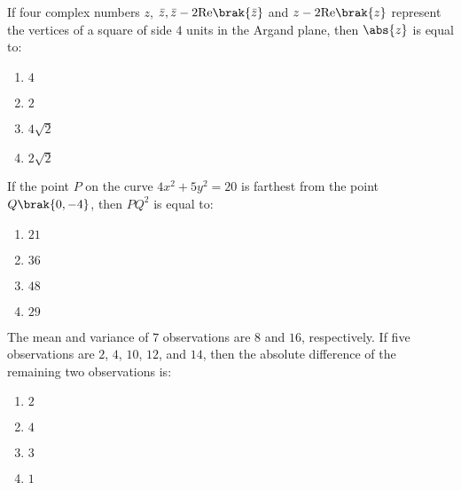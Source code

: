     \item If four complex numbers $z$, $\bar{z},\bar{z} - 2 \text{Re}\brak{\bar{z}}$ and $z - 2 \text{Re}\brak{z}$ represent the vertices of a square of side $4$ units in the Argand plane, then $\abs{z}$ is equal to:
    \begin{enumerate}
        \item $4$
        \item $2$
        \item $4\sqrt{2}$
        \item $2\sqrt{2}$
    \end{enumerate}

    \item If the point $P$ on the curve $4x^2 + 5y^2 = 20$ is farthest from the point $Q\brak{0, -4}$, then $PQ^2$ is equal to:
    \begin{enumerate}
        \item $21$
        \item $36$
        \item $48$
        \item $29$
    \end{enumerate}

    \item The mean and variance of $7$ observations are $8$ and $16$, respectively. If five observations are $2$, $4$, $10$, $12$, and $14$, then the absolute difference of the remaining two observations is:
    \begin{enumerate}
        \item $2$
        \item $4$
        \item $3$
        \item $1$
    \end{enumerate}



